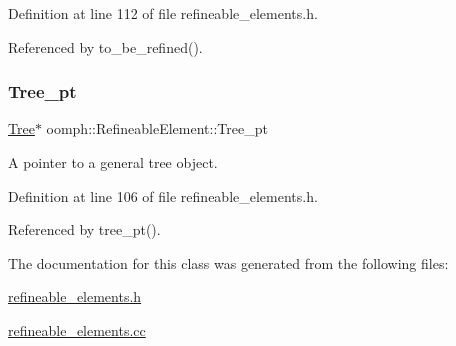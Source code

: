Definition at line 112 of file refineable\+\_\+elements.\+h.



Referenced by to\+\_\+be\+\_\+refined().

\mbox{\label{classoomph_1_1RefineableElement_a465cd89744b63cf2aae72c8a73ad338d}} 
\subsubsection{\texorpdfstring{Tree\+\_\+pt}{Tree\_pt}}
{\footnotesize\ttfamily \hyperlink{classoomph_1_1Tree}{Tree}$\ast$ oomph\+::\+Refineable\+Element\+::\+Tree\+\_\+pt\hspace{0.3cm}{\ttfamily [protected]}}



A pointer to a general tree object. 



Definition at line 106 of file refineable\+\_\+elements.\+h.



Referenced by tree\+\_\+pt().



The documentation for this class was generated from the following files\+:\begin{DoxyCompactItemize}
\item 
\hyperlink{refineable__elements_8h}{refineable\+\_\+elements.\+h}\item 
\hyperlink{refineable__elements_8cc}{refineable\+\_\+elements.\+cc}\end{DoxyCompactItemize}
